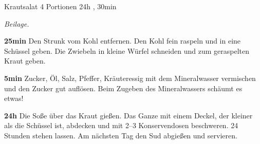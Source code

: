 \begin{recipe}{Krautsalat} {4 Portionen} {24h , 30min }

  \freeform{}\textit{Beilage.}


  \textbf{25min}
  Den Strunk vom Kohl entfernen.
  Den Kohl fein raspeln und in eine Schüssel geben.
  Die Zwiebeln in kleine Würfel schneiden und zum geraspelten Kraut geben.

  \newstep{}\textbf{5min}
  Zucker, Öl, Salz, Pfeffer, Kräuteressig mit dem Mineralwasser vermischen und den Zucker gut auflösen.
  Beim Zugeben des Mineralwassers schäumt es etwas!

  \newstep{}\textbf{24h}
  Die Soße über das Kraut gießen.
  Das Ganze mit einem Deckel, der kleiner als die Schüssel ist, abdecken und mit 2–3 Konservendosen beschweren.
  24 Stunden stehen lassen.
  Am nächsten Tag den Sud abgießen und servieren.

  \freeform{}\hrulefill{}

\end{recipe}
